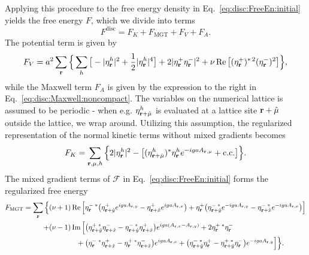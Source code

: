 Applying this procedure to the free energy density in Eq.~\eqref{eq:disc:FreeEn:initial} yields the free energy $F$, which we divide into terms
\begin{equation}
  F^\text{disc} = F_K + F_\text{MGT} + F_V + F_A.
  \label{eq:disc:FreeEn:disc}
\end{equation}
The potential term is given by
\begin{equation}
  F_V = a^2\sum_{\boldsymbol{\mathbf{r}}}\Big\{\sum_h\big[-|\eta^h_{\boldsymbol{\mathbf{r}}}|^2 + \frac{1}{2}|\eta^h_{\boldsymbol{\mathbf{r}}}|^4\big] + 2|\eta^+_{\boldsymbol{\mathbf{r}}}\eta^-_{\boldsymbol{\mathbf{r}}}|^2 + \nu\operatorname{Re}\big[(\eta^+_{\boldsymbol{\mathbf{r}}})^{\ast\,2}(\eta_{\boldsymbol{\mathbf{r}}}^-)^2\big]\Big\},
  \label{eq:disc:FreeEn:disc:potential}
\end{equation}
while the Maxwell term $F_A$ is given by the expression to the right in Eq.~\eqref{eq:disc:Maxwell:noncompact}. The variables on the numerical lattice is assumed to be periodic - 
when e.g. $\eta_{{\boldsymbol{\mathbf{r}}}+\hat{\mu}}^h$ is evaluated at a lattice site ${\boldsymbol{\mathbf{r}}} + \hat{\mu}$ outside the lattice, we wrap around. Utilizing this assumption, the regularized representation of the normal
kinetic terms without mixed gradients becomes
\begin{equation}
  F_K = \sum_{{\boldsymbol{\mathbf{r}}},\mu,h}\Big\{2|\eta^h_{\boldsymbol{\mathbf{r}}}|^2 - \big[(\eta^h_{{\boldsymbol{\mathbf{r}}}+\hat{\mu}})^\ast\eta^h_{\boldsymbol{\mathbf{r}}}e^{-igaA_{{\boldsymbol{\mathbf{r}}},\mu}} + \text{c.c.}\big]\Big\}.
  \label{eq:disc:FreeEn:disc:kin}
\end{equation}
The mixed gradient terms of $\mathcal{F}$ in Eq.~\eqref{eq:disc:FreeEn:initial} forms the regularized free energy
\begin{equation}
  \begin{split}
	F_\text{MGT} = \sum_{\boldsymbol{\mathbf{r}}}\Big\{&(\nu+1)\operatorname{Re}\Big[\eta^{-\;\ast}_{\boldsymbol{\mathbf{r}}}\big(\eta^+_{{\boldsymbol{\mathbf{r}}}+\hat{y}}e^{igaA_{{\boldsymbol{\mathbf{r}}},y}}-\eta^+_{{\boldsymbol{\mathbf{r}}}+\hat{x}}e^{igaA_{{\boldsymbol{\mathbf{r}}},x}}\big)
	+ \eta^+_{\boldsymbol{\mathbf{r}}}\big(\eta^{-\;\ast}_{{\boldsymbol{\mathbf{r}}}+\hat{y}}e^{-igaA_{{\boldsymbol{\mathbf{r}}},y}} - \eta^{-\;\ast}_{{\boldsymbol{\mathbf{r}}}+\hat{x}}e^{-igaA_{{\boldsymbol{\mathbf{r}}},x}}\big)\Big]\\
	+&(\nu-1)\operatorname{Im}\Big[\big(\eta^{+\;\ast}_{{\boldsymbol{\mathbf{r}}}+\hat{y}}\eta^-_{{\boldsymbol{\mathbf{r}}}+\hat{x}} - \eta^{-\;\ast}_{{\boldsymbol{\mathbf{r}}}+\hat{y}}\eta^+_{{\boldsymbol{\mathbf{r}}}+\hat{x}}\big)e^{iga(A_{{\boldsymbol{\mathbf{r}}},x}-A_{{\boldsymbol{\mathbf{r}}},y})} + 2\eta^{+\;\ast}_{\boldsymbol{\mathbf{r}}}\eta^-_{\boldsymbol{\mathbf{r}}}\\
	  &\qquad\quad\;\;\;+\big(\eta^{-\;\ast}_{\boldsymbol{\mathbf{r}}}\eta^+_{{\boldsymbol{\mathbf{r}}}+\hat{x}} - \eta^{+\;\ast}_{\boldsymbol{\mathbf{r}}}\eta^-_{{\boldsymbol{\mathbf{r}}}+\hat{x}}\big)e^{igaA_{{\boldsymbol{\mathbf{r}}},x}}
	+ \big(\eta^{-\;\ast}_{{\boldsymbol{\mathbf{r}}}+\hat{y}}\eta^+_{\boldsymbol{\mathbf{r}}} - \eta^{+\;\ast}_{{\boldsymbol{\mathbf{r}}}+\hat{y}}\eta^-_{\boldsymbol{\mathbf{r}}}\big)e^{-igaA_{{\boldsymbol{\mathbf{r}}},y}}\Big]\Big\}.
  \end{split}
  \label{eq:disc:FreeEn:disc:MGT}
\end{equation}

